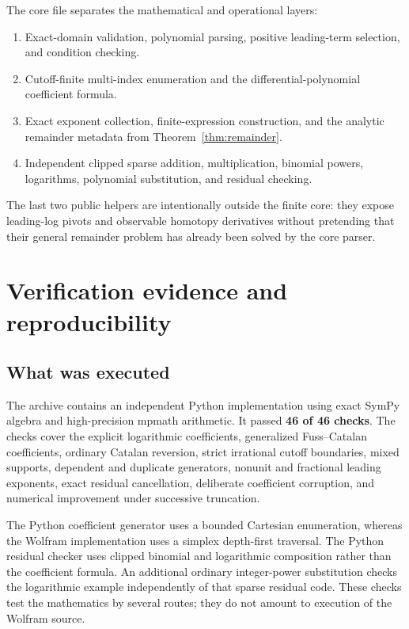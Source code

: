 \documentclass[11pt,a4paper]{article}
\numberwithin{equation}{section}
\theoremstyle{definition}
\theoremstyle{remark}
\begin{document}
The core file separates the mathematical and operational layers:
\begin{enumerate}[leftmargin=1.8em,itemsep=0.2em]
\item Exact-domain validation, polynomial parsing, positive leading-term
selection, and condition checking.
\item Cutoff-finite multi-index enumeration and the differential-polynomial
coefficient formula.
\item Exact exponent collection, finite-expression construction, and the
analytic remainder metadata from Theorem~\ref{thm:remainder}.
\item Independent clipped sparse addition, multiplication, binomial powers,
logarithms, polynomial substitution, and residual checking.
\end{enumerate}
The last two public helpers are intentionally outside the finite core:
they expose leading-log pivots and observable homotopy derivatives without
pretending that their general remainder problem has already been solved
by the core parser.

\section{Verification evidence and reproducibility}
\label{sec:validation}

\subsection{What was executed}

The archive contains an independent Python implementation using exact
SymPy algebra and high-precision mpmath arithmetic. It passed
\textbf{46 of 46 checks}. The checks cover the explicit logarithmic
coefficients, generalized Fuss--Catalan coefficients, ordinary Catalan
reversion, strict irrational cutoff boundaries, mixed supports, dependent
and duplicate generators, nonunit and fractional leading exponents,
exact residual cancellation, deliberate coefficient corruption, and
numerical improvement under successive truncation.

The Python coefficient generator uses a bounded Cartesian enumeration,
whereas the Wolfram implementation uses a simplex depth-first traversal.
The Python residual checker uses clipped binomial and logarithmic
composition rather than the coefficient formula. An additional ordinary
integer-power substitution checks the logarithmic example independently
of that sparse residual code. These checks test the mathematics by several
routes; they do not amount to execution of the Wolfram source.
\end{document}
